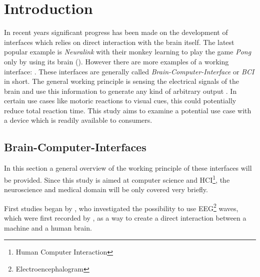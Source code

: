 
    \chapter{Introduction}



        In recent years significant progress has been made on the development of interfaces which relies on direct interaction with the brain itself.  The latest popular example is \textit{Neuralink} with their monkey learning to play the game \textit{Pong} only by using its brain (\cite{Neuralink.2021}). However there are more examples of a working interface: .
        These interfaces are generally called \textit{Brain-Computer-Interface} or \textit{BCI} in short. The general working principle is sensing the electrical signals of the brain and use this information to generate any kind of arbitrary output . 
        In certain use cases like motoric reactions to visual cues, this could potentially reduce total reaction time. This study aims to examine a potential use case with a device which is readily available to consumers.
        

        \section{Brain-Computer-Interfaces}\label{intro-bci}

            In this section a general overview of the working principle of these interfaces will be provided. Since this study is aimed at computer science and HCI\footnote{Human Computer Interaction}, the neuroscience and medical domain will be only covered very briefly.


            First studies began by \cite{Vidal.1973}, who investigated the possibility to use EEG\footnote{Electroencephalogram} waves, which were first recorded by \cite{Berger.1929}, as a way to create a direct interaction between a machine and a human brain. 

